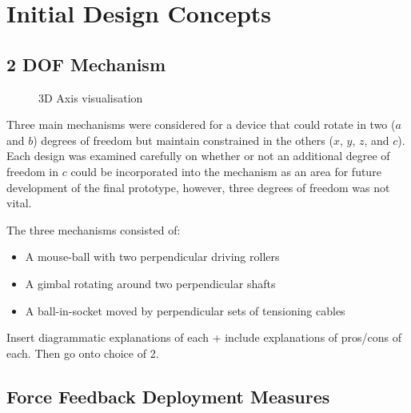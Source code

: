 
\section{Initial Design Concepts} %
\label{sec:initial_design_concepts}

\subsection{2 DOF Mechanism} %
\label{sub:2_dof_mechanism}

\begin{wrapfigure}{R}{0.4\textwidth}
  
  \caption{3D Axis visualisation}
  \label{fig:3d_axis}
\end{wrapfigure}

Three main mechanisms were considered for a device that could rotate in two ($a$ and $b$)
degrees of freedom but maintain constrained in the others ($x$, $y$, $z$, and $c$).
Each design was examined carefully on whether or not an additional degree of
freedom in $c$ could be incorporated into the mechanism as an area for future
development of the final prototype, however, three degrees of freedom was not
vital.

The three mechanisms consisted of:

\begin{itemize}
  \item A mouse-ball with two perpendicular driving rollers
  \item A gimbal rotating around two perpendicular shafts
  \item A ball-in-socket moved by perpendicular sets of tensioning cables
\end{itemize}

{\color{red}Insert diagrammatic explanations of each + include explanations of pros/cons of each.
Then go onto choice of 2.}


\subsection{Force Feedback Deployment Measures} %
\label{sub:force_feedback_deployment_measures}

